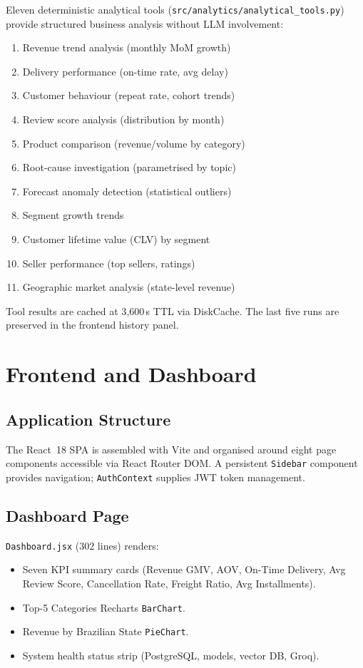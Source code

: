 \documentclass[conference]{IEEEtran}
\begin{document}
Eleven deterministic analytical tools (\texttt{src/analytics/analytical\_tools.py}) provide
structured business analysis without LLM involvement:
\begin{enumerate}[leftmargin=*,noitemsep,topsep=2pt]
  \item Revenue trend analysis (monthly MoM growth)
  \item Delivery performance (on-time rate, avg delay)
  \item Customer behaviour (repeat rate, cohort trends)
  \item Review score analysis (distribution by month)
  \item Product comparison (revenue/volume by category)
  \item Root-cause investigation (parametrised by topic)
  \item Forecast anomaly detection (statistical outliers)
  \item Segment growth trends
  \item Customer lifetime value (CLV) by segment
  \item Seller performance (top sellers, ratings)
  \item Geographic market analysis (state-level revenue)
\end{enumerate}
Tool results are cached at 3{,}600\,s TTL via DiskCache. The last five runs are preserved
in the frontend history panel.

\section{Frontend and Dashboard}

\subsection{Application Structure}

The React~18 SPA is assembled with Vite and organised around eight page components
accessible via React Router DOM.  A persistent \texttt{Sidebar} component provides
navigation; \texttt{AuthContext} supplies JWT token management.

\subsection{Dashboard Page}

\texttt{Dashboard.jsx} (302 lines) renders:
\begin{itemize}[noitemsep,topsep=2pt,leftmargin=*]
  \item Seven KPI summary cards (Revenue GMV, AOV, On-Time Delivery,
        Avg Review Score, Cancellation Rate, Freight Ratio, Avg Installments).
  \item Top-5 Categories Recharts \texttt{BarChart}.
  \item Revenue by Brazilian State \texttt{PieChart}.
  \item System health status strip (PostgreSQL, models, vector DB, Groq).
\end{itemize}
\end{document}
